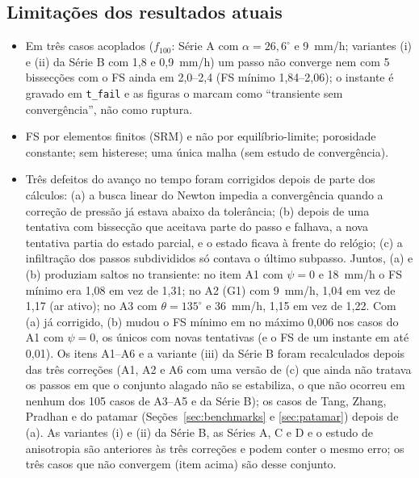 \subsection{Limita\c{c}\~oes dos resultados atuais}

\begin{itemize}
\item Em tr\^es casos acoplados ($f_{100}$: S\'erie A com $\alpha=26{,}6^\circ$ e 9~mm/h; variantes (i) e (ii) da S\'erie
B com 1,8 e 0,9~mm/h) um passo n\~ao converge nem com 5 bissec\c{c}\~oes com o FS ainda em 2,0--2,4 (FS m\'inimo
1,84--2,06); o instante \'e gravado em \texttt{t\_fail} e as figuras o marcam como ``transiente sem converg\^encia'',
n\~ao como ruptura.
\item FS por elementos finitos (SRM) e n\~ao por equil\'ibrio-limite; porosidade constante; sem histerese; uma \'unica
malha (sem estudo de converg\^encia).
\item Tr\^es defeitos do avan\c{c}o no tempo foram corrigidos depois de parte dos c\'alculos: (a) a busca linear do
Newton impedia a converg\^encia quando a corre\c{c}\~ao de press\~ao j\'a estava abaixo da toler\^ancia; (b) depois de
uma tentativa com bissec\c{c}\~ao que aceitava parte do passo e falhava, a nova tentativa partia do estado parcial, e o
estado ficava \`a frente do rel\'ogio; (c) a infiltra\c{c}\~ao dos passos subdivididos s\'o contava o \'ultimo
subpasso. Juntos, (a) e (b) produziam saltos no transiente: no item A1 com $\psi=0$ e 18~mm/h o FS m\'inimo era 1,08
em vez de 1,31; no A2 (G1) com 9~mm/h, 1,04 em vez de 1,17 (ar ativo); no A3 com $\theta=135^\circ$ e 36~mm/h, 1,15 em
vez de 1,22. Com (a) j\'a corrigido, (b) mudou o FS m\'inimo em no m\'aximo 0,006 nos casos do A1 com $\psi=0$, os
\'unicos com novas tentativas (e o FS de um instante em at\'e 0,01). Os itens A1--A6 e a variante (iii) da S\'erie B
foram recalculados depois das tr\^es corre\c{c}\~oes (A1, A2 e A6 com uma vers\~ao de (c) que ainda n\~ao tratava os
passos em que o conjunto alagado n\~ao se estabiliza, o que n\~ao ocorreu em nenhum dos 105 casos de A3--A5 e da
S\'erie B); os casos de Tang, Zhang, Pradhan e do patamar (Se\c{c}\~oes~\ref{sec:benchmarks} e \ref{sec:patamar})
depois de (a). As variantes (i) e (ii) da S\'erie B, as S\'eries A, C e D e o estudo de anisotropia s\~ao anteriores
\`as tr\^es corre\c{c}\~oes e podem conter o mesmo erro; os tr\^es casos que n\~ao convergem (item acima) s\~ao desse
conjunto.
\end{itemize}
